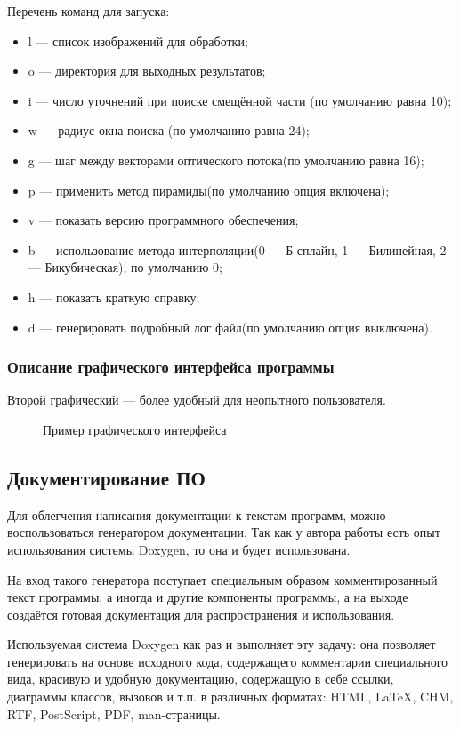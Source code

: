 Перечень команд для запуска:
\begin{itemize}
\item l — список изображений для обработки;
\item o — директория для выходных результатов;
\item i — число уточнений при поиске смещённой части (по умолчанию равна 10);
\item w — радиус окна поиска (по умолчанию равна 24);
\item g — шаг между векторами оптического потока(по умолчанию равна 16);
\item p — применить метод пирамиды(по умолчанию опция включена);
\item v — показать версию программного обеспечения;
\item b — использование метода интерполяции(0 — Б-сплайн, 1 — Билинейная, 2 — Бикубическая), по умолчанию 0;
\item h — показать краткую справку;
\item d — генерировать подробный лог файл(по умолчанию опция выключена).
\end{itemize}
\subsubsection{Описание графического интерфейса программы}
Второй графический — более удобный для неопытного пользователя. 

\begin{figure}[ht]
\caption{Пример графического интерфейса}
\label{pic:gui_scr}
\end{figure}

\subsection{Документирование ПО}
Для облегчения написания документации к текстам программ, можно воспользоваться генератором документации. Так как у автора работы есть опыт использования системы Doxygen, то она и будет использована.

На вход такого генератора поступает специальным образом комментированный текст программы, а иногда и другие компоненты программы, а на выходе создаётся готовая документация для распространения и использования.

Используемая система Doxygen как раз и выполняет эту задачу: она позволяет генерировать на основе исходного кода, содержащего комментарии специального вида, красивую и удобную документацию, содержащую в себе ссылки, диаграммы классов, вызовов и т.п. в различных форматах: HTML, LaTeX, CHM, RTF, PostScript, PDF, man-страницы.

